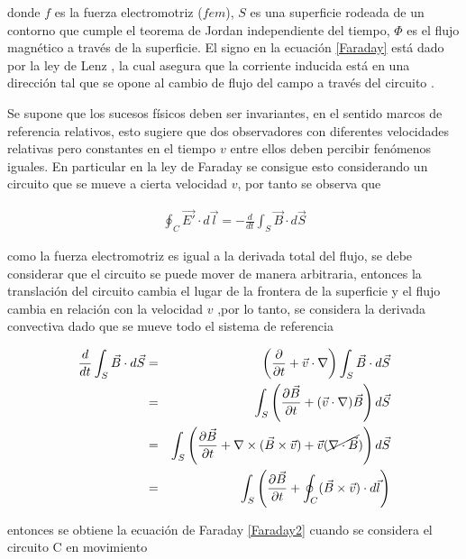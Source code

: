 \noindent donde $f$ es la fuerza electromotriz ($fem$), $S$ es una superficie rodeada de un contorno que cumple el teorema de Jordan \cite{Rudin} independiente del tiempo, $\Phi$ es el flujo magnético a través de la superficie. El signo en la ecuación \eqref{Faraday} está dado por la ley de Lenz \cite{Purcell}, la cual asegura que  la corriente inducida está en una dirección tal que se opone al cambio de flujo del campo  a través del circuito .\\

\medskip

\noindent Se supone que los sucesos físicos deben ser invariantes, en el sentido marcos de referencia relativos, esto sugiere que dos observadores con diferentes velocidades relativas pero constantes en el tiempo $v$ entre ellos deben percibir fenómenos iguales. En particular en la ley de Faraday se consigue esto considerando un circuito que se mueve a cierta velocidad $v$, por tanto se observa que 

\begin{eqnarray}
\label{Faraday2}
    \oint_{C} \vec{E'}\cdot d\vec{l} = -\frac{d }{dt}\int_{S}\vec{B}\cdot d\vec{S}
\end{eqnarray}

\noindent como la fuerza electromotriz es igual a la derivada total del flujo, se debe considerar que el circuito se puede mover de manera arbitraria, entonces la translación del circuito cambia el lugar de la frontera de la superficie y el flujo cambia en relación con la velocidad $v$ ,por lo tanto, se considera la derivada convectiva dado que se mueve todo el sistema de referencia

\begin{eqnarray}
    \frac{d }{dt}\int_{S}\vec{B}\cdot d\vec{S} &=& \left(\frac{\partial}{\partial t} + \vec{v}\cdot\nabla\right)\int_{S}\vec{B}\cdot d\vec{S}\nonumber\\
    &=& \int_{S}\left(\frac{\partial \vec{B}}{\partial t} + (\vec{v}\cdot\nabla)\vec{B}\right)d\vec{S}\nonumber \\
    &=&\int_{S}\left(\frac{\partial \vec{B}}{\partial t} + \nabla \times (\vec{B} \times \vec{v}) +\vec{v}(\cancel{\nabla \cdot \vec{B}})\right)d\vec{S}\nonumber \\
    &=&\int_{S}\left(\frac{\partial \vec{B}}{\partial t} + \oint_{C}(\vec{B}\times \vec{v})\cdot d\vec{l}\right)
\end{eqnarray}

\noindent entonces se obtiene la ecuación de Faraday \eqref{Faraday2} cuando se considera el circuito C en movimiento 

